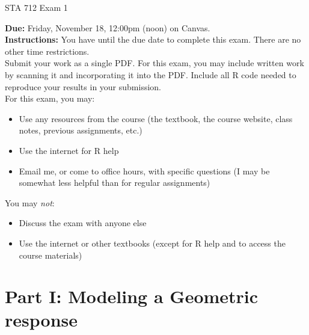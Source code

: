 \documentclass[11pt]{article}
\begin{document}
\begin{center}
\Large
STA 712 Exam 1\\
\normalsize
\vspace{5mm}
\end{center}

\noindent \textbf{Due:} Friday, November 18, 12:00pm (noon) on Canvas.\\ 

\noindent \textbf{Instructions:} You have until the due date to complete this exam. There are no other time restrictions.\\

\noindent Submit your work as a single PDF. For this exam, you may include written work by scanning it and incorporating it into the PDF. Include all R code needed to reproduce your results in your submission.\\

\noindent For this exam, you may:
\begin{itemize}
\item Use any resources from the course (the textbook, the course website, class notes, previous assignments, etc.)
\item Use the internet for R help
\item Email me, or come to office hours, with specific questions (I may be somewhat less helpful than for regular assignments)
\end{itemize}
You may \textit{not}:
\begin{itemize}
\item Discuss the exam with anyone else
\item Use the internet or other textbooks (except for R help and to access the course materials)
\end{itemize}

\newpage

\section*{Part I: Modeling a Geometric response}
\end{document}
